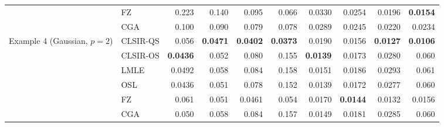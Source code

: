 \begin{tabular}{llrrrrrrrr}
 & FZ & 0.223 & 0.140 & 0.095 & 0.066 & 0.0330 & 0.0254 & 0.0196 & \textbf{0.0154}\\
 & CGA & 0.100 & 0.090 & 0.079 & 0.078 & 0.0289 & 0.0245 & 0.0220 & 0.0234\\
\addlinespace
Example 4 (Gaussian, $p=2$) & CLSIR-QS & 0.056 & \textbf{0.0471} & \textbf{0.0402} & \textbf{0.0373} & 0.0190 & 0.0156 & \textbf{0.0127} & \textbf{0.0106}\\
 & CLSIR-OS & \textbf{0.0436} & 0.052 & 0.080 & 0.155 & \textbf{0.0139} & 0.0173 & 0.0280 & 0.060\\
 & LMLE & 0.0492 & 0.058 & 0.084 & 0.158 & 0.0151 & 0.0186 & 0.0293 & 0.061\\
 & OSL & 0.0436 & 0.051 & 0.078 & 0.152 & 0.0139 & 0.0172 & 0.0277 & 0.060\\
 & FZ & 0.061 & 0.051 & 0.0461 & 0.054 & 0.0170 & \textbf{0.0144} & 0.0132 & 0.0156\\
 & CGA & 0.050 & 0.058 & 0.084 & 0.157 & 0.0149 & 0.0181 & 0.0285 & 0.060\\
\bottomrule
\end{tabular}